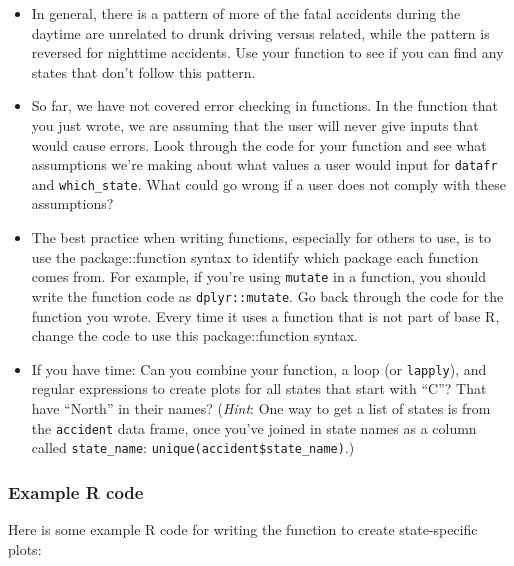 \documentclass[]{book}
\providecommand{\tightlist}{%
  \setlength{\itemsep}{0pt}\setlength{\parskip}{0pt}}
\begin{document}
\begin{itemize}
\tightlist
\item
  In general, there is a pattern of more of the fatal accidents during
  the daytime are unrelated to drunk driving versus related, while the
  pattern is reversed for nighttime accidents. Use your function to see
  if you can find any states that don't follow this pattern.
\item
  So far, we have not covered error checking in functions. In the
  function that you just wrote, we are assuming that the user will never
  give inputs that would cause errors. Look through the code for your
  function and see what assumptions we're making about what values a
  user would input for \texttt{datafr} and \texttt{which\_state}. What
  could go wrong if a user does not comply with these assumptions?
\item
  The best practice when writing functions, especially for others to
  use, is to use the package::function syntax to identify which package
  each function comes from. For example, if you're using \texttt{mutate}
  in a function, you should write the function code as
  \texttt{dplyr::mutate}. Go back through the code for the function you
  wrote. Every time it uses a function that is not part of base R,
  change the code to use this package::function syntax.
\item
  If you have time: Can you combine your function, a loop (or
  \texttt{lapply}), and regular expressions to create plots for all
  states that start with ``C''? That have ``North'' in their names?
  (\emph{Hint}: One way to get a list of states is from the
  \texttt{accident} data frame, once you've joined in state names as a
  column called \texttt{state\_name}:
  \texttt{unique(accident\$state\_name)}.)
\end{itemize}

\subsubsection{Example R code}\label{example-r-code-12}

Here is some example R code for writing the function to create
state-specific plots:
\end{document}
